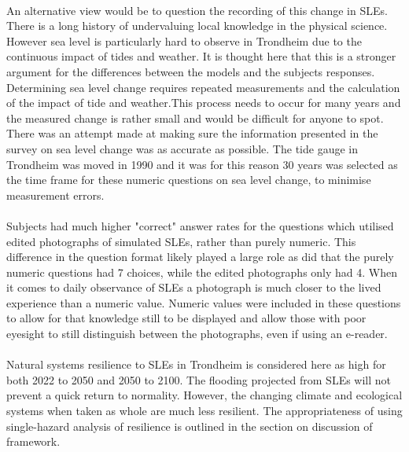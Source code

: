 \paragraph{}
An alternative view would be to question the recording of this change in SLEs. There is a long history of undervaluing local knowledge in the physical science. However sea level is particularly hard to observe in Trondheim due to the continuous impact of tides and weather. It is thought here that this is a stronger argument for the differences between the models and the subjects responses. Determining sea level change requires repeated measurements and the calculation of the impact of tide and weather.This process needs to occur for many years and the measured change is rather small and would be difficult for anyone to spot. There was an attempt made at making sure the information presented in the survey on sea level change was as accurate as possible. The tide gauge in Trondheim was moved in 1990 and it was for this reason 30 years was selected as the time frame for these numeric questions on sea level change, to minimise measurement errors. 

\paragraph{}
Subjects had much higher "correct" answer rates for the questions which utilised edited photographs of simulated SLEs, rather than purely numeric. This difference in the question format likely played a large role as did that the purely numeric questions had 7 choices, while the edited photographs only had 4. When it comes to daily observance of SLEs a photograph is much closer to the lived experience than a numeric value. Numeric values were included in these questions to allow for that knowledge still to be displayed and allow those with poor eyesight to still distinguish between the photographs, even if using an e-reader.
\paragraph{}
Natural systems resilience to SLEs in Trondheim is considered here as high for both 2022 to 2050 and 2050 to 2100. The flooding projected from SLEs will not prevent a quick return to normality. However, the changing climate and ecological systems when taken as whole are much less resilient. The appropriateness of using single-hazard analysis of resilience is outlined in the section on discussion of framework.



